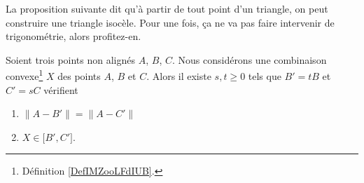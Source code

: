 La proposition suivante dit qu'à partir de tout point d'un triangle, on peut construire une triangle isocèle. Pour une fois, ça ne va pas faire intervenir de trigonométrie, alors profitez-en.
\begin{proposition}	\label{PROPooMRZEooWuLKvU}
	Soient trois points non alignés \( A\), \( B\), \( C\). Nous considérons une combinaison convexe\footnote{Définition \ref{DefIMZooLFdIUB}.} \( X\) des points \( A\), \( B\) et \( C\). Alors il existe \( s,t\geq 0\) tels que \( B'=tB\) et \( C'=sC\) vérifient
	\begin{enumerate}
		\item
		      \( \| A-B' \|=\| A-C' \|\)
		\item
		      \( X\in\mathopen[ B',C'\mathclose]\).
	\end{enumerate}
\end{proposition}

